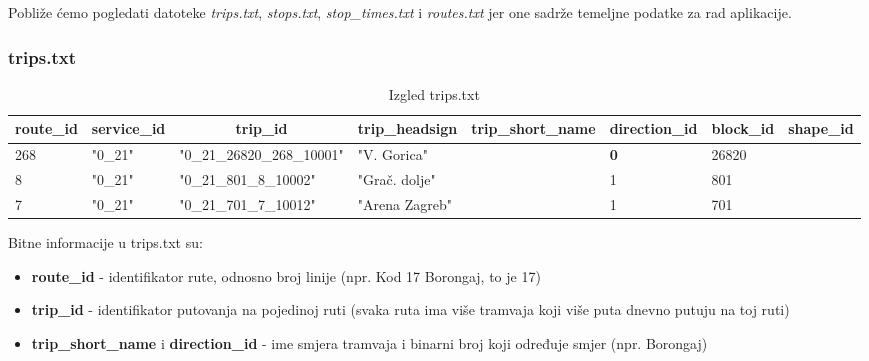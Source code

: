 \documentclass[zavrsnirad]{fer}
\begin{document}
Pobliže ćemo pogledati datoteke \textit{trips.txt}, \textit{stops.txt}, \textit{stop\_times.txt} i \textit{routes.txt} jer one sadrže temeljne podatke za rad aplikacije.

\subsubsection{trips.txt}

\begin{table}[htb]
	\begin{adjustbox}{width=\columnwidth,center}
	\begin{tabular}{l|l|l|l|l|l|l|l}
		\hline
		\multicolumn{1}{c|}{\textbf{route\_id}} & \multicolumn{1}{c|}{\textbf{service\_id}} & \multicolumn{1}{c|}{\textbf{trip\_id}} & \multicolumn{1}{c|}{\textbf{trip\_headsign}} & \multicolumn{1}{c|}{\textbf{trip\_short\_name}} & \multicolumn{1}{c|}{\textbf{direction\_id}} & \multicolumn{1}{c|}{\textbf{block\_id}} & \multicolumn{1}{c}{\textbf{shape\_id}} \\ \hline
		268 & "0\_21" & "0\_21\_26820\_268\_10001" & "V. Gorica" &  & \textbf{0} & 26820 &  \\ \hline
		8 & "0\_21" & "0\_21\_801\_8\_10002" & "Grač. dolje" & \textbf{} & 1 & 801 &  \\ \hline
		7 & "0\_21" & "0\_21\_701\_7\_10012" & "Arena Zagreb" & \textbf{} & 1 & 701 &  \\ \hline
	\end{tabular}
	\end{adjustbox}
	\caption{Izgled trips.txt}
	\label{tbl:trips}
\end{table}


Bitne informacije u trips.txt su:
\begin{itemize}
	\item \textbf{route\_id} - identifikator rute, odnosno broj linije (npr. Kod 17 Borongaj, to je 17)
	\item \textbf{trip\_id} - identifikator putovanja na pojedinoj ruti (svaka ruta ima više tramvaja koji više puta dnevno putuju na toj ruti)
	\item \textbf{trip\_short\_name} i \textbf{direction\_id} - ime smjera tramvaja i binarni broj koji određuje smjer (npr. Borongaj)
\end{itemize}
\end{document}

